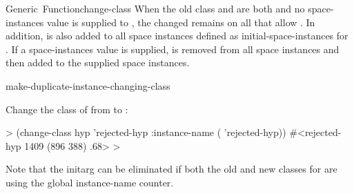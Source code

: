 \documentclass[10pt,twoside,english,pdftex]{article}
\begin{document}
\begin{functiondoc}{Generic~Function}{change-class}
When the old class and  are both  and no
space-instances value is supplied to , the changed
 remains on all  that allow
 .  In addition,  is
also added to all space instances defined as initial-space-instances for
.  If a space-instances value is supplied,  is
removed from all space instances and then added to the supplied space
instances.

\begin{alsos}{make-duplicate-instance-changing-class}
\end{alsos}

\fnexample
{}%
%
Change the class of   from
 to :
%
\W\supp
\begin{example}
  > (change-class hyp 'rejected-hyp 
      :instance-name ( 'rejected-hyp))
  #<rejected-hyp 1409 (896 388) .68>
  >
\end{example} 
%
Note that the  initarg can be eliminated if both
the old and new classes for  are using the global instance-name
counter.

\end{functiondoc}

\end{document}
